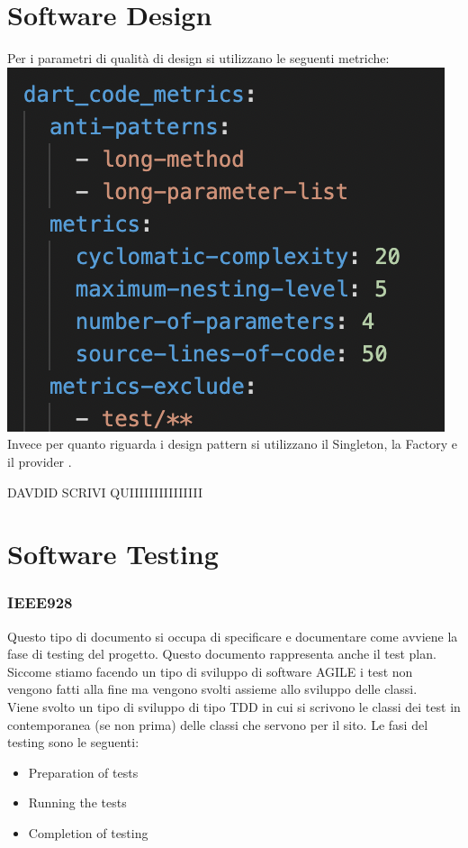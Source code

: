 \documentclass{article}
\begin{document}
\begin{itemize}
\newpage
\section{Software Design}
Per i parametri di qualità di design si utilizzano le seguenti metriche:
\\\includegraphics[scale = 0.75]{"Immagini/ParametriQuality.png"}
\\Invece per quanto riguarda i design pattern si utilizzano il Singleton, la Factory e il provider .

DAVDID SCRIVI QUIIIIIIIIIIIIIII

\newpage
\section{Software Testing}
\subsubsection{IEEE928}
Questo tipo di documento si occupa di specificare e documentare come avviene la fase di testing
del progetto. Questo documento rappresenta anche il test plan. Siccome stiamo facendo un tipo di
sviluppo di software AGILE i test non vengono fatti alla fine ma vengono svolti assieme allo
sviluppo delle classi.
\\Viene svolto un tipo di sviluppo di tipo TDD in cui si scrivono le classi dei test in 
contemporanea (se non prima) delle classi che servono per il sito. Le fasi del testing sono le 
seguenti:
\begin{itemize}
    \item Preparation of tests 
    \item Running the  tests
    \item Completion of testing
\end{itemize} 


\end{itemize}
\end{document}
